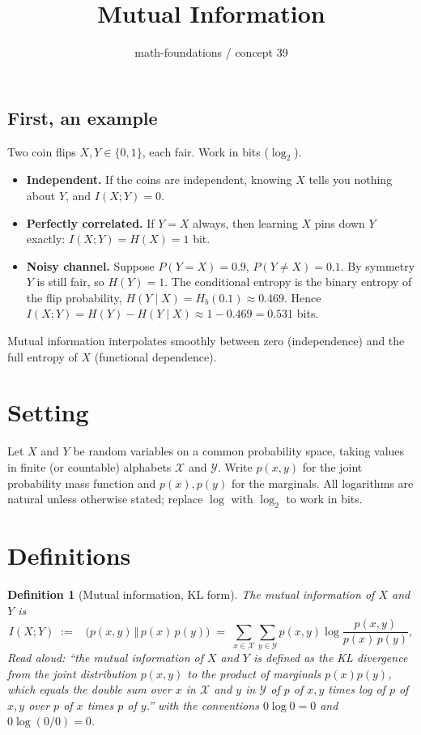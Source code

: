 \documentclass[11pt]{article}
\title{Mutual Information}
\author{math-foundations / concept 39}
\date{}
\newtheorem{definition}{Definition}
\DeclareMathOperator{\KL}{D_{\mathrm{KL}}}
\begin{document}
\maketitle

\subsection*{First, an example}

Two coin flips $X, Y \in \{0, 1\}$, each fair. Work in bits ($\log_2$).
\begin{itemize}
  \item \textbf{Independent.} If the coins are independent, knowing $X$ tells you
    nothing about $Y$, and $I(X; Y) = 0$.
  \item \textbf{Perfectly correlated.} If $Y = X$ always, then learning $X$ pins
    down $Y$ exactly: $I(X; Y) = H(X) = 1$ bit.
  \item \textbf{Noisy channel.} Suppose $P(Y = X) = 0.9$, $P(Y \ne X) = 0.1$. By
    symmetry $Y$ is still fair, so $H(Y) = 1$. The conditional entropy is the
    binary entropy of the flip probability,
    $H(Y \mid X) = H_b(0.1) \approx 0.469$. Hence
    $I(X; Y) = H(Y) - H(Y \mid X) \approx 1 - 0.469 = 0.531$ bits.
\end{itemize}
Mutual information interpolates smoothly between zero (independence) and the full
entropy of $X$ (functional dependence).

\section{Setting}

Let $X$ and $Y$ be random variables on a common probability space, taking values in
finite (or countable) alphabets $\mathcal{X}$ and $\mathcal{Y}$. Write $p(x, y)$ for
the joint probability mass function and $p(x), p(y)$ for the marginals. All
logarithms are natural unless otherwise stated; replace $\log$ with $\log_2$ to
work in bits.

\section{Definitions}

\begin{definition}[Mutual information, KL form]
The \emph{mutual information} of $X$ and $Y$ is
\[
  I(X; Y) \;:=\; \KL\!\bigl(p(x, y) \,\Vert\, p(x)\, p(y)\bigr)
              \;=\; \sum_{x \in \mathcal{X}} \sum_{y \in \mathcal{Y}}
                    p(x, y) \log \frac{p(x, y)}{p(x)\, p(y)},
\]
\emph{Read aloud:} ``the mutual information of $X$ and $Y$ is defined as the KL
divergence from the joint distribution $p(x, y)$ to the product of marginals
$p(x) p(y)$, which equals the double sum over $x$ in $\mathcal{X}$ and $y$ in
$\mathcal{Y}$ of $p$ of $x, y$ times log of $p$ of $x, y$ over $p$ of $x$ times
$p$ of $y$.''
with the conventions $0 \log 0 = 0$ and $0 \log (0/0) = 0$.
\end{definition}
\end{document}
